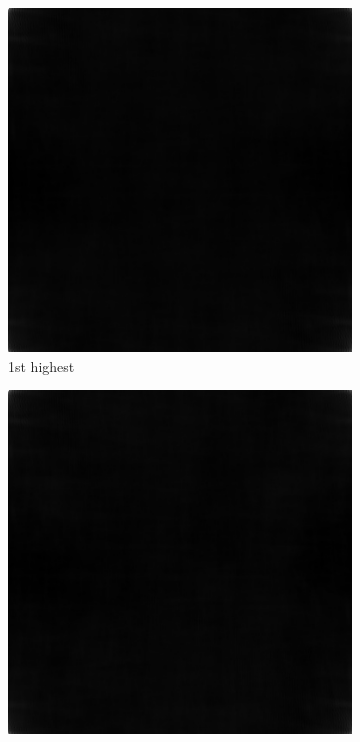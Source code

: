 \begin{figure}[h!]
\centering
\begin{subfigure}{0.2\textwidth}
  \centering
  \includegraphics[width=0.95\linewidth]{output/phase_high_1.jpg}
  \caption{1st highest}
\end{subfigure}%
\begin{subfigure}{0.2\textwidth}
  \centering
  \includegraphics[width=0.95\linewidth]{output/phase_high_25.jpg}

\end{subfigure}
\end{figure}
